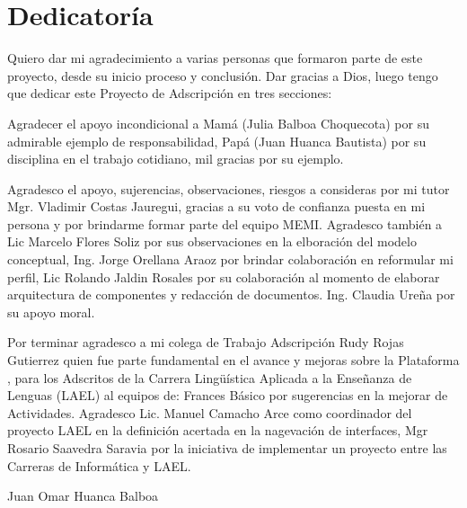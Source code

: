 \chapter*{Dedicator\'{i}a}

Quiero dar mi agradecimiento a varias personas que formaron parte de este 
proyecto, desde su inicio proceso y conclusi\'{o}n. Dar gracias a Dios, 
luego tengo que dedicar este Proyecto de Adscripci\'{o}n en tres secciones:

Agradecer el apoyo incondicional a Mam\'{a} (Julia Balboa Choquecota) por su 
admirable ejemplo de responsabilidad, Pap\'{a} (Juan Huanca Bautista) por
su disciplina en el trabajo cotidiano, mil gracias por su ejemplo.

Agradesco el apoyo, sujerencias, observaciones, riesgos a consideras por mi 
tutor Mgr. Vladimir Costas Jauregui, gracias a su voto de confianza puesta en 
mi persona y por brindarme formar parte del equipo MEMI. Agradesco tambi\'{e}n
a Lic Marcelo Flores Soliz por sus observaciones en la elboraci\'{o}n del 
modelo conceptual, Ing. Jorge Orellana Araoz por brindar colaboraci\'{o}n en 
reformular mi perfil, Lic Rolando Jaldin Rosales por su colaboraci\'{o}n al 
momento de elaborar arquitectura de componentes y redacci\'{o}n de documentos. 
Ing. Claudia Ure\~{n}a por su apoyo moral.

Por terminar agradesco a mi colega de Trabajo Adscripci\'{o}n Rudy Rojas 
Gutierrez quien fue parte fundamental en el avance y mejoras sobre la Plataforma
, para los Adscritos de la Carrera Ling\"{u}\'{i}stica Aplicada a la 
Ense\~{n}anza de Lenguas (LAEL) al equipos de: Frances B\'{a}sico por sugerencias
en la mejorar de Actividades. Agradesco Lic. Manuel Camacho Arce como coordinador
del proyecto LAEL en la definici\'{o}n acertada en la nagevaci\'{o}n de 
interfaces, Mgr Rosario Saavedra Saravia por la iniciativa de implementar un 
proyecto entre las Carreras de Inform\'{a}tica y LAEL. 

\begin{flushright}
    Juan Omar Huanca Balboa
\end{flushright}
